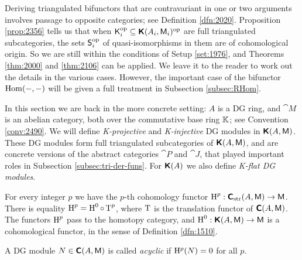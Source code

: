 \begin{rem} \label{5050}
Deriving triangulated bifunctors that are contravariant in one or two arguments 
involves passage to opposite categories; see Definition \ref{dfn:2020}. 
Proposition \ref{prop:2356} tells us that when 
$\operatorname{\mathsf{K}}_i^{\mathrm{op}} \subseteq \boldsymbol{\mathsf{K}}(A_i, \operatorname{\mathsf{M}}_i)^{\mathrm{op}}$
are full triangulated subcategories, the sets 
$\operatorname{\mathsf{S}}_i^{\mathrm{op}}$
of quasi-isomorphisms in them are of cohomological origin. So we are still 
within the conditions of Setup \ref{set:1976}, and Theorems \ref{thm:2000} and 
\ref{thm:2106} can be applied. 
We leave it to the reader to work out the details in the various cases. 
However, the important case of the bifunctor $\operatorname{Hom}(-, -)$ 
will be given a full treatment in Subsection \ref{subsec:RHom}.
\end{rem}
 




\cleardoublepage
{} 
\label{sec:resol} 

\AYcopyright

In this section we are back in the more concrete setting: $A$ is a DG ring, 
and $\cat{M}$ is an abelian category, both over the commutative base ring 
$\mathbb{K}$; see Convention \ref{conv:2490}. We will define {\em K-projective} and 
{\em K-injective} DG modules in
$\operatorname{\boldsymbol{\mathsf{K}}}(A, \operatorname{\mathsf{M}})$. These DG modules form full triangulated 
subcategories of $\operatorname{\boldsymbol{\mathsf{K}}}(A, \operatorname{\mathsf{M}})$, and are concrete versions of the 
abstract categories $\cat{P}$ and $\cat{J}$, that played important roles in 
Subsection \ref{subsec:tri-der-funs}.
For $\operatorname{\boldsymbol{\mathsf{K}}}(A)$ we also define {\em K-flat DG modules}.

 \label{subsec:K-inj}

For every integer $p$ we have the $p$-th cohomology functor 
$\operatorname{H}^p : \operatorname{\boldsymbol{\mathsf{C}}}_{\mathrm{str}}(A, \operatorname{\mathsf{M}}) \to \operatorname{\mathsf{M}}$.
There is equality 
$\operatorname{H}^p = \operatorname{H}^0 \circ \operatorname{T}^p$,
where $\operatorname{T}$ is the translation functor of $\operatorname{\boldsymbol{\mathsf{C}}}(A, \operatorname{\mathsf{M}})$. 
The functors $\operatorname{H}^p$ pass to the homotopy category, and 
$\operatorname{H}^0 : \operatorname{\boldsymbol{\mathsf{K}}}(A, \operatorname{\mathsf{M}}) \to \operatorname{\mathsf{M}}$
is a cohomological functor, in the sense of Definition \ref{dfn:1510}.

\begin{dfn} \label{dfn:1505}
A DG module $N \in \boldsymbol{\mathsf{C}}(A, \operatorname{\mathsf{M}})$ is called {\em acyclic}%
if $\mathrm{H}^p(N) = 0$ for all $p$. 
\end{dfn}

